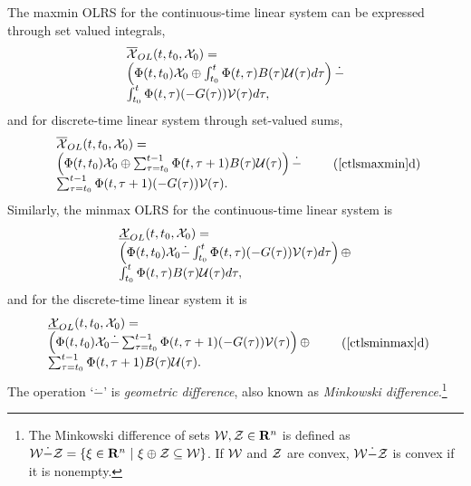 The maxmin OLRS for the continuous-time linear system can be expressed through
set valued integrals,
\begin{equation}
\begin{array}{l}
\OXOL(t, t_0, \XX_0) = \\
\left(\Phi(t, t_0)\XX_0 \oplus
\int_{t_0}^t\Phi(t, \tau)B(\tau)\UU(\tau)d\tau\right) \dot{-} \\
\int_{t_0}^t\Phi(t, \tau)(-G(\tau))\VV(\tau)d\tau,
\end{array}
\label{ctlsmaxmin}
\end{equation}
and for discrete-time linear system through set-valued sums,
\begin{equation}
\begin{array}{l}
\OXOL(t, t_0, \XX_0) = \\
\left(\Phi(t, t_0)\XX_0 \oplus
\sum_{\tau=t_0}^{t-1}\Phi(t, \tau+1)B(\tau)\UU(\tau)\right) \dot{-} \\
\sum_{\tau=t_0}^{t-1}\Phi(t, \tau+1)(-G(\tau))\VV(\tau).
\end{array}
\tag*{(\ref{ctlsmaxmin}d)}
\label{dtlsmaxmin}
\end{equation}
Similarly, the minmax OLRS for the continuous-time linear system is
\begin{equation}
\begin{array}{l}
\UXOL(t, t_0, \XX_0) = \\
\left(\Phi(t, t_0)\XX_0 \dot{-}
\int_{t_0}^t\Phi(t, \tau)(-G(\tau))\VV(\tau)d\tau\right)
\oplus \\
\int_{t_0}^t\Phi(t, \tau)B(\tau)\UU(\tau)d\tau,
\end{array}
\label{ctlsminmax}
\end{equation}
and for the discrete-time linear system it is
\begin{equation}
\begin{array}{l}
\UXOL(t, t_0, \XX_0) = \\
\left(\Phi(t, t_0)\XX_0 \dot{-}
\sum_{\tau=t_0}^{t-1}\Phi(t, \tau+1)(-G(\tau))\VV(\tau)\right)
\oplus \\
\sum_{\tau=t_0}^{t-1}\Phi(t, \tau+1)B(\tau)\UU(\tau).
\end{array}
\tag*{(\ref{ctlsminmax}d)}
\label{dtlsminmax}
\end{equation}
The operation `$\dot{-}$' is \emph{geometric difference}, also known as
\emph{Minkowski difference}.\footnote{The Minkowski difference of sets
$\WW, \ZZ \in{\bf R}^n$ is defined as
$\WW\dot{-}\ZZ = \left\{\xi\in{\bf R}^n ~|~
\xi \oplus \ZZ \subseteq \WW\right\}$.
If  $\WW$ and $\ZZ$ are convex,  $\WW\dot{-}\ZZ$ is convex if it is nonempty.}

